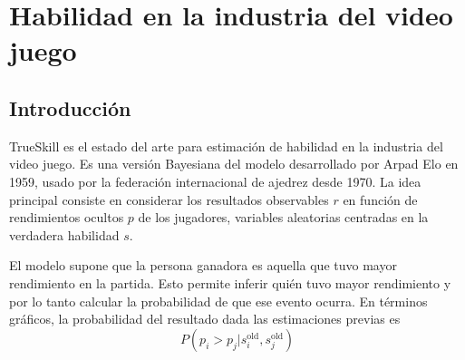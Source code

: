 \documentclass[a4paper,10pt]{article}
\begin{document}
\section{Habilidad en la industria del video juego} \label{sec:trueskill}

\subsection{Introducci\'on}


TrueSkill es el estado del arte para estimaci\'on de habilidad en la industria del video juego.
Es una versión Bayesiana del modelo desarrollado por Arpad Elo en 1959, usado por la federaci\'on internacional de ajedrez desde 1970.
La idea principal consiste en considerar los resultados observables $r$ en funci\'on de rendimientos ocultos $p$ de los jugadores, variables aleatorias centradas en la verdadera habilidad $s$.

\begin{figure}[H]
\centering 
{} 
\end{figure}

El modelo supone que la persona ganadora es aquella que tuvo mayor rendimiento en la partida.
Esto permite inferir qui\'en tuvo mayor rendimiento y por lo tanto calcular la probabilidad de que ese evento ocurra.
En t\'erminos gr\'aficos, la probabilidad del resultado dada las estimaciones previas es
\begin{equation}
P (p_i > p_j | s_i^\text{old} , s_j^\text{old} )
\end{equation}
\end{document}
